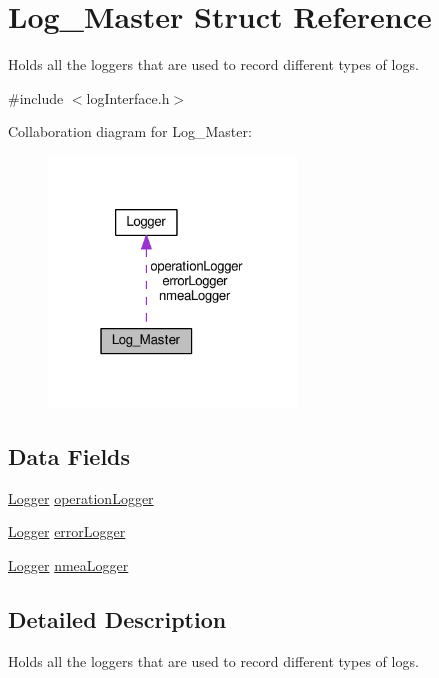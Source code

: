 \hypertarget{struct_log___master}{}\section{Log\+\_\+\+Master Struct Reference}
\label{struct_log___master}


Holds all the loggers that are used to record different types of logs.  




{\ttfamily \#include $<$log\+Interface.\+h$>$}



Collaboration diagram for Log\+\_\+\+Master\+:
\nopagebreak
\begin{figure}[H]
\begin{center}
\leavevmode
\includegraphics[width=187pt]{struct_log___master__coll__graph}
\end{center}
\end{figure}
\subsection*{Data Fields}
\begin{DoxyCompactItemize}
\item 
\hyperlink{struct_logger}{Logger} \hyperlink{struct_log___master_a86b17527dd6375131f69c50edcaa0d00}{operation\+Logger}
\item 
\hyperlink{struct_logger}{Logger} \hyperlink{struct_log___master_ad2f23f105d708487d58a08cfc0492d4a}{error\+Logger}
\item 
\hyperlink{struct_logger}{Logger} \hyperlink{struct_log___master_a39b31051fe482d807aba1796b4b0591c}{nmea\+Logger}
\end{DoxyCompactItemize}


\subsection{Detailed Description}
Holds all the loggers that are used to record different types of logs. 

